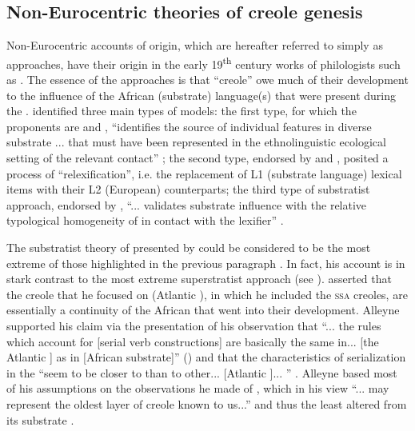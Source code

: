 \subsection {Non-Eurocentric theories of creole genesis} \label{2.2.2}
Non-Eurocentric accounts of origin, which are hereafter referred to simply as  approaches, have their origin in the early 19\textsuperscript{th} century works of philologists such as  \citet{Baissac80}. The essence of the  approaches is that ``creole''  owe much of their development to the influence of the African (substrate) language(s) that were present during the . \citet{Mufwene90, Mufwene96b} identified three main types of  models: the first type, for which the proponents are  \citet{Alleyne80, Alleyne96} and  \citet{Holm89}, ``identifies the source of individual features in diverse substrate ... that must have been represented in the ethnolinguistic ecological setting of the relevant contact'' \citep[167]{Mufwene96b}; the second type, endorsed by  \citet{Lefebvre98, Lefebvre04} and  \citet{Lumsden99}, posited a process of ``relexification'', i.e. the replacement of L1 (substrate language) lexical items with their L2 (European) counterparts; the third type of substratist approach, endorsed by  \citet{Keesing88}, ``... validates substrate influence with the relative typological homogeneity of  in contact with the lexifier'' \citep[167]{Mufwene96b}.

The substratist theory of  presented by \citet{Alleyne80} could be considered to be the most extreme of those highlighted in the previous paragraph \citep{Byrne87}. In fact, his account is in stark contrast to the most extreme superstratist approach (see ).  \citet{Alleyne80} asserted that the creole  that he focused on (Atlantic   ), in which he included the \textsc{ssa} creoles, are essentially a continuity of the African  that went into their development. Alleyne supported his claim via the presentation of his observation that ``... the rules which account for [serial verb constructions] are basically the same in... [the Atlantic ] as in   [African substrate]'' (\citeyear[167]{Alleyne80}) and that the characteristics of serialization in the   ``seem to be closer to  than to other... [Atlantic ]... '' \citep[167]{Alleyne80}. Alleyne based most of his assumptions on the observations he made of , which in his view ``... may represent the oldest layer of creole known to us...'' and thus the least altered from its substrate \citep[91]{Alleyne79}.

